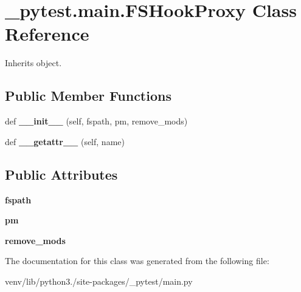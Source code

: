 \hypertarget{class__pytest_1_1main_1_1_f_s_hook_proxy}{}\section{\+\_\+pytest.\+main.\+F\+S\+Hook\+Proxy Class Reference}
\label{class__pytest_1_1main_1_1_f_s_hook_proxy}


Inherits object.

\subsection*{Public Member Functions}
\begin{DoxyCompactItemize}
\item 
\mbox{\label{class__pytest_1_1main_1_1_f_s_hook_proxy_a695c96ea7e7a38789d39415e77ec0f55}} 
def {\bfseries \+\_\+\+\_\+init\+\_\+\+\_\+} (self, fspath, pm, remove\+\_\+mods)
\item 
\mbox{\label{class__pytest_1_1main_1_1_f_s_hook_proxy_a1ec18036844cdd764d60b8827ee1b9f3}} 
def {\bfseries \+\_\+\+\_\+getattr\+\_\+\+\_\+} (self, name)
\end{DoxyCompactItemize}
\subsection*{Public Attributes}
\begin{DoxyCompactItemize}
\item 
\mbox{\label{class__pytest_1_1main_1_1_f_s_hook_proxy_a47b85ec7af2877a5b744022b7e0c98a6}} 
{\bfseries fspath}
\item 
\mbox{\label{class__pytest_1_1main_1_1_f_s_hook_proxy_a9d15233f652f6de6a3b23e90863a44d1}} 
{\bfseries pm}
\item 
\mbox{\label{class__pytest_1_1main_1_1_f_s_hook_proxy_a06359fb2d081a733c7c51a120a558ebf}} 
{\bfseries remove\+\_\+mods}
\end{DoxyCompactItemize}


The documentation for this class was generated from the following file\+:\begin{DoxyCompactItemize}
\item 
venv/lib/python3./site-\/packages/\+\_\+pytest/main.\+py\end{DoxyCompactItemize}

